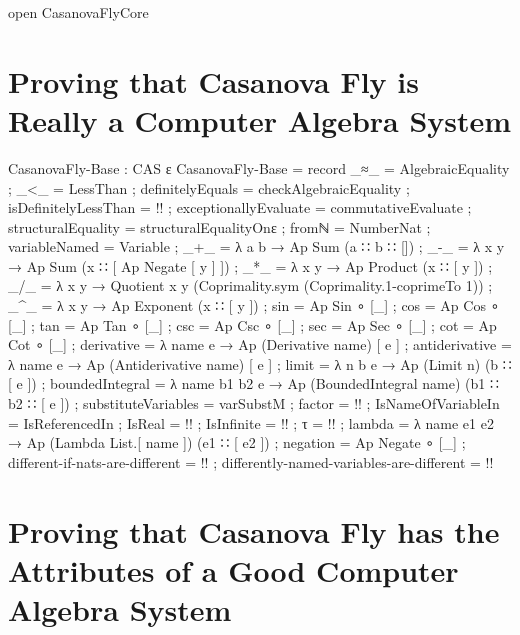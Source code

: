 \documentclass{report}
\begin{document}
\begin{code}
open CasanovaFlyCore
\end{code}

\chapter{Proving that Casanova Fly is Really a Computer Algebra System}

\begin{code}
CasanovaFly-Base : CAS ε
CasanovaFly-Base = record
  { _≈_ = AlgebraicEquality
  ; _<_ = LessThan
  ; definitelyEquals = checkAlgebraicEquality
  ; isDefinitelyLessThan = {!!}
  ; exceptionallyEvaluate = commutativeEvaluate
  ; structuralEquality = structuralEqualityOnε
  ; fromℕ = NumberNat
  ; variableNamed = Variable
  ; _+_ = λ a b → Ap Sum (a ∷ b ∷ [])
  ; _-_ = λ x y → Ap Sum (x ∷ [ Ap Negate [ y ] ])
  ; _*_ = λ x y → Ap Product (x ∷ [ y ])
  ; _/_ = λ x y → Quotient x y (Coprimality.sym (Coprimality.1-coprimeTo 1))
  ; _^_ = λ x y → Ap Exponent (x ∷ [ y ])
  ; sin = Ap Sin ∘ [_]
  ; cos = Ap Cos ∘ [_]
  ; tan = Ap Tan ∘ [_]
  ; csc = Ap Csc ∘ [_]
  ; sec = Ap Sec ∘ [_]
  ; cot = Ap Cot ∘ [_]
  ; derivative = λ name e → Ap (Derivative name) [ e ]
  ; antiderivative = λ name e → Ap (Antiderivative name) [ e ]
  ; limit = λ n b e → Ap (Limit n) (b ∷ [ e ])
  ; boundedIntegral = λ name b1 b2 e → Ap (BoundedIntegral name) (b1 ∷ b2 ∷ [ e ])
  ; substituteVariables = varSubstM
  ; factor = {!!}
  ; IsNameOfVariableIn = IsReferencedIn
  ; IsReal = {!!}
  ; IsInfinite = {!!}
  ; τ = {!!}
  ; lambda = λ name e1 e2 → Ap (Lambda List.[ name ]) (e1 ∷ [ e2 ])
  ; negation = Ap Negate ∘ [_]
  ; different-if-nats-are-different = {!!}
  ; differently-named-variables-are-different = {!!}
  }
\end{code}

\chapter{Proving that Casanova Fly has the Attributes of a Good Computer Algebra System}
\end{document}

